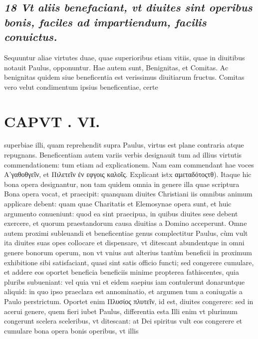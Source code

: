 \documentclass{article}
\begin{document}
\begin{pages}
\subsection*{\textit{18 Vt aliis benefaciant, vt diuites sint operibus bonis, faciles ad impartiendum, facilis conuictus. }}\pstart Sequuntur aliae virtutes duae, quae superioribus etiam vitiis, quae in diuitibus notauit Paulus, opponuntur. Hae autem sunt, Benignitas, et Comitas. Ac benignitas quidem siue beneficentia est verissimus diuitiarum fructus. Comitas vero velut condimentum ipsius beneficentiae, certe  \pend
\section*{CAPVT . VI. }
\marginpar{[ p.501 ]}\pstart superbiae illi, quam reprehendit supra Paulus, virtus est plane contraria atque repugnans.  \pend\pstart Beneficentiam autem variis verbis designauit tum ad illius virtutis commendationem: tum etiam ad explicationem. Nam eam commendant hae voces Α'γαθοθγεῖν, et Πιλετεῖν ἐν εφγοις καλοῖς. Explicant istx αμεταδότοςτθ).  \pend\pstart Itaque hic bona opera designantur, non tam quidem omnia in genere illa quae scriptura Bona opera vocat, et praecipit: quanquam diuites Christiani iis omnibus animum applicare debent: quam quae Charitatis et Elemosynae opera sunt, et huic argumento conueniunt: quod ea sint praecipua, in quibus diuites sese debent exercere, et quorum praestandorum causa diuitias a Domino acceperunt. Omne autem proximi subleuandi et beneficentiae genus complectitur Paulus, cùm vult ita diuites suas opes collocare et dispensare, vt ditescant abundentque in omni genere bonorum operum, non vt vnius aut alterius tantùm beneficii in proximum exhibitione sibi satisfaciant, quasi sint satis officio functi; sed congerere cumulare, et addere eos oportet beneficia beneficiis minime propterea fathiscentes, quia pluribs subueniant: vel quia vni et eidem saepius iam contulerunt donaruntque aliquid: in quo ipso praeclara est annominatio, et argumen tum a coniugatis a Paulo perstrictum. Oportet enim Πλυσίος πλυτεῖν, id est, diuites congerere: sed in acerui genere, quem fieri iubet Paulus, differentia esta Illi enim vt plurimum congerunt scelera sceleribus, vt ditescant: at Dei spiritus vult eos congerere et cumulare bona opera bonis operibus, vt illis  \pend

\end{pages}
\end{document}
